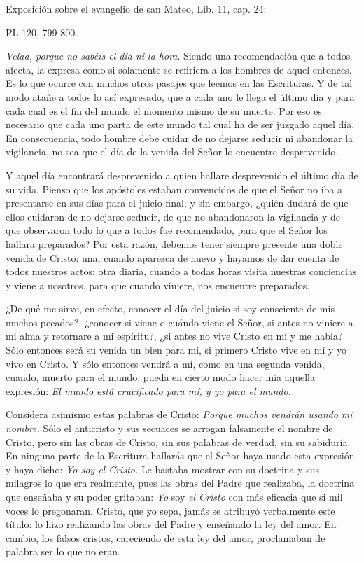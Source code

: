 \documentclass[]{article}
\begin{document}
Exposición sobre el evangelio de san Mateo, Lib. 11, cap. 24:

PL 120, 799-800.

\emph{Velad, porque no sabéis el día ni la hora}. Siendo una recomendación que a todos afecta, la expresa como si solamente se refiriera a los hombres de aquel entonces. Es lo que ocurre con muchos otros pasajes que leemos en las Escrituras. Y de tal modo atañe a todos lo así expresado, que a cada uno le llega el último día y para cada cual es el fin del mundo el momento mismo de su muerte. Por eso es necesario que cada uno parta de este mundo tal cual ha de ser juzgado aquel día. En consecuencia, todo hombre debe cuidar de no dejarse seducir ni abandonar la vigilancia, no sea que el día de la venida del Señor lo encuentre desprevenido.

Y aquel día encontrará desprevenido a quien hallare desprevenido el último día de su vida. Pienso que los apóstoles estaban convencidos de que el Señor no iba a presentarse en sus días para el juicio final; y sin embargo, ¿quién dudará de que ellos cuidaron de no dejarse seducir, de que no abandonaron la vigilancia y de que observaron todo lo que a todos fue recomendado, para que el Señor los hallara preparados? Por esta razón, debemos tener siempre presente una doble venida de Cristo: una, cuando aparezca de nuevo y hayamos de dar cuenta de todos nuestros actos; otra diaria, cuando a todas horas visita nuestras conciencias y viene a nosotros, para que cuando viniere, nos encuentre preparados.

¿De qué me sirve, en efecto, conocer el día del juicio si soy consciente de mis muchos pecados?, ¿conocer si viene o cuándo viene el Señor, si antes no viniere a mi alma y retornare a mi espíritu?, ¿si antes no vive Cristo en mí y me habla? Sólo entonces será su venida un bien para mí, si primero Cristo vive en mí y yo vivo en Cristo. Y sólo entonces vendrá a mí, como en una segunda venida, cuando, muerto para el mundo, pueda en cierto modo hacer mía aquella expresión: \emph{El mundo está crucificado 	para mí, y yo para el mundo.}

Considera asimismo estas palabras de Cristo: \emph{Porque muchos vendrán 	usando mi nombre.} Sólo el anticristo y sus secuaces se arrogan falsamente el nombre de Cristo, pero sin las obras de Cristo, sin sus palabras de verdad, sin su sabiduría. En ninguna parte de la Escritura hallarás que el Señor haya usado esta expresión y haya dicho: \emph{Yo 	soy el Cristo.} Le bastaba mostrar con su doctrina y sus milagros lo que era realmente, pues las obras del Padre que realizaba, la doctrina que enseñaba y su poder gritaban: \emph{Yo} soy \emph{el Cristo} con más eficacia que si mil voces lo pregonaran. Cristo, que yo sepa, jamás se atribuyó verbalmente este título: lo hizo realizando las obras del Padre y enseñando la ley del amor. En cambio, los falsos cristos, careciendo de esta ley del amor, proclamaban de palabra ser lo que no eran.
\end{document}

